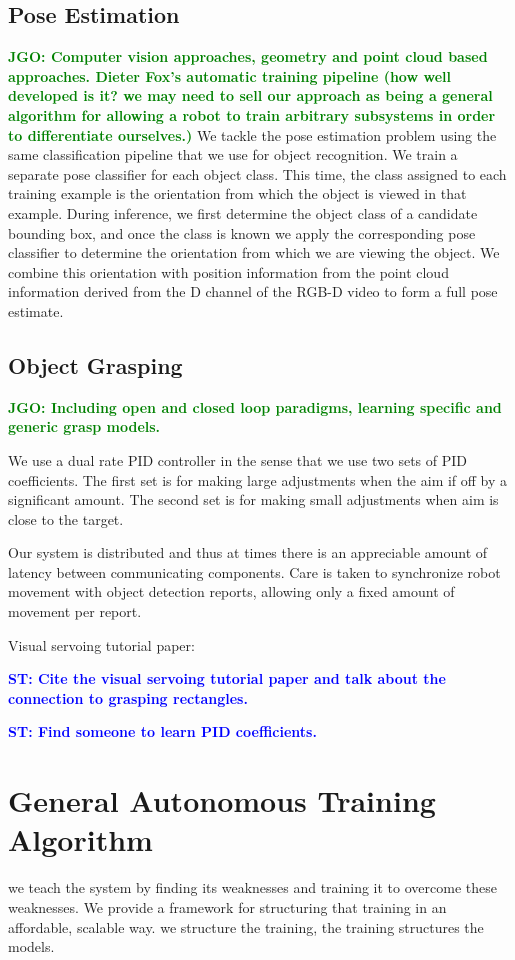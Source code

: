 \documentclass[conference]{IEEEtran}
\newcommand{\stnote}[1]{\textcolor{Blue}{\textbf{ST: #1}}}
\newcommand{\jgonote}[1]{\textcolor{Green}{\textbf{JGO: #1}}}
\begin{document}
\subsection{Pose Estimation}
\jgonote{Computer vision approaches, geometry and point cloud based approaches. Dieter Fox's automatic
training pipeline (how well developed is it? we may need to sell our approach as being a 
general algorithm for allowing a robot to train arbitrary subsystems in order to differentiate 
ourselves.)}
We tackle the pose estimation problem using the same classification pipeline that we use for
object recognition. We train a separate pose classifier for each object class. This time, the class
assigned to each training example is the orientation from which the object is viewed in that example.
During inference, we first determine the object class of a candidate bounding box, and once the class
is known we apply the corresponding pose classifier to determine the orientation from which we
are viewing the object. We combine this orientation with position information from the point cloud
information derived from the D channel of the RGB-D video to form a full pose estimate.

\subsection{Object Grasping}
\jgonote{Including open and closed loop paradigms, learning specific and generic grasp models.}

We use a dual rate PID controller in the sense that we use two sets of PID coefficients. The
first set is for making large adjustments when the aim if off by a significant amount. The
second set is for making small adjustments when aim is close to the target.

Our system is distributed and thus at times there is an appreciable amount of latency between
communicating components. Care is taken to synchronize robot movement with object detection
reports, allowing only a fixed amount of movement per report.

Visual servoing tutorial paper: \citep{chaumette06}

\stnote{Cite the visual servoing tutorial paper and talk about the
  connection to grasping rectangles.}

\stnote{Find someone to learn PID coefficients.}

\section{General Autonomous Training Algorithm}
\label{sec:training}
we teach the system by finding its weaknesses and training it to overcome these 
weaknesses. We provide a framework for structuring that training in an affordable, 
scalable way.  we structure the training, the training structures the models.
\end{document}
